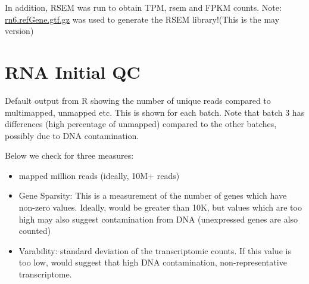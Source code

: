 \documentclass[
]{book}
\newenvironment{Shaded}{\begin{snugshade}}{\end{snugshade}}
\newcommand{\DecValTok}[1]{\textcolor[rgb]{0.00,0.00,0.81}{#1}}
\newcommand{\NormalTok}[1]{#1}
\newcommand{\OperatorTok}[1]{\textcolor[rgb]{0.81,0.36,0.00}{\textbf{#1}}}
\providecommand{\tightlist}{%
  \setlength{\itemsep}{0pt}\setlength{\parskip}{0pt}}
\begin{document}
\begin{Shaded}
\end{Shaded}

In addition, RSEM was run to obtain TPM, rsem and FPKM counts.
Note: \href{http://hgdownload.soe.ucsc.edu/goldenPath/rn6/bigZips/genes/rn6.ncbiRefSeq.gtf.gz}{rn6.refGene.gtf.gz} was used to generate the RSEM library!(This is the may version)

\hypertarget{rna-initial-qc}{%
\section{RNA Initial QC}\label{rna-initial-qc}}

Default output from R showing the number of unique reads compared to multimapped, unmapped etc. This is shown for each batch.
Note that batch 3 has differences (high percentage of unmapped) compared to the other batches, possibly due to DNA contamination.

Below we check for three measures:

\begin{itemize}
\tightlist
\item
  mapped million reads (ideally, 10M+ reads)
\item
  Gene Sparsity: This is a measurement of the number of genes which have non-zero values. Ideally, would be greater than 10K, but values which are too high may also suggest contamination from DNA (unexpressed genes are also counted)
\item
  Varability: standard deviation of the transcriptomic counts. If this value is too low, would suggest that high DNA contamination, non-representative transcriptome.
\end{itemize}
\end{document}
